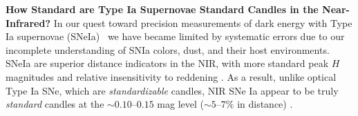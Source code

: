 \documentclass[11pt]{article}
\begin{document}
%

%

%
%
%

\sciencejustification
{\bf How Standard are Type Ia Supernovae Standard Candles in the Near-Infrared?} 
In our quest toward precision measurements of dark energy with Type Ia supernovae (SNeIa)~\cite{astier06,wood-vasey07,kowalski08,hicken09b,kessler09,conley11,betoule14} we have became limited by 
systematic errors due to our incomplete understanding of SNIa colors, dust, and 
their host environments.
SNeIa are superior distance
indicators in the NIR, with more standard peak $H$ magnitudes and
relative insensitivity to reddening
\cite{meikle00,krisciunas04a,krisciunas07}. 
As a result, unlike optical Type Ia SNe, which are {\em standardizable} candles,
 NIR SNe Ia
appear to be truly {\em standard} candles at the $\sim0.10$--$0.15$ mag
level ($\sim5$--$7\%$ in distance)
\cite{krisciunas04a,krisciunas05a,wood-vasey08,folatelli10,weyant14,barone-nugent12,kattner12}.
\end{document}

